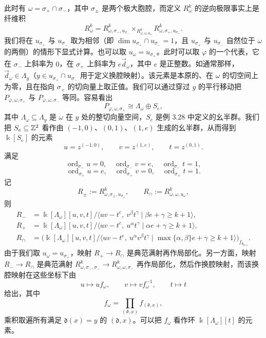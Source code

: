 此时有 $\omega=\sigma_+\cap\sigma_-$，其中 $\sigma_\pm$ 是两个极大胞腔，而定义 $R^k_\omega$ 的逆向极限事实上是纤维积
\[
  R^k_\omega=R^k_{\omega,\sigma_-,u_{\sigma_-}}
  \times_{R^k_{\omega,\omega,u_\omega}}R^k_{\omega,\sigma_+,u_{\sigma_+}}.
\]
我们将在 $u_{\sigma_+}$ 与 $u_{\sigma_-}$ 取为相邻（即 $\dim u_{\sigma_+}\cap u_{\sigma_-}=1$，且 $u_{\sigma_+}$ 与 $u_{\sigma_-}$ 自然位于 $\omega$ 的两侧）的情形下显式计算。也可以取 $u_\omega=u_{\sigma_+}$。此时可以取 $\varphi$ 的一个代表，它在 $\sigma_-$ 上斜率为 $0$，在 $\sigma_+$ 上斜率为 $e\vec d_\omega$，其中 $e$ 是正整数。如通常那样，$\vec d_\omega\in\Lambda_y$（$y\in u_{\sigma_+}\cap u_{\sigma_-}$ 用于定义换腔映射）。该元素是本原的、在 $\omega$ 的切空间上为零，且在指向 $\sigma_+$ 的切向量上取正值。我们可以通过穿过 $y$ 的平行移动把 $P_{\varphi,\omega,\sigma_+}$ 与 $P_{\varphi,\omega,\sigma_-}$ 等同。容易看出
\[
  P_{\varphi,\omega,\sigma_+}\cong\Lambda_\omega\oplus S_e,
\]
其中 $\Lambda_\omega\subseteq\Lambda_y$ 是 $\omega$ 在 $y$ 处的整切向量空间，$S_e$ 是例 3.28 中定义的幺半群。我们把 $S_e\subseteq\mathbb{Z}^2$ 看作由 $(-1,0)$、$(0,1)$、$(1,e)$ 生成的幺半群，从而得到 $\Bbbk[S_e]$ 的元素
\[
  u=z^{(-1,0)},\qquad v=z^{(1,e)},\qquad t=z^{(0,1)}.
\]
满足
\[
  \operatorname{ord}_{\sigma_-}u=0,\quad
  \operatorname{ord}_{\sigma_-}v=e,\quad
  \operatorname{ord}_{\sigma_-}t=1,
\]
\[
  \operatorname{ord}_{\sigma_+}u=e,\quad
  \operatorname{ord}_{\sigma_+}v=0,\quad
  \operatorname{ord}_{\sigma_+}t=1.
\]
记
\[
  R_\pm:=R^k_{\omega,\sigma_\pm,u_{\sigma_\pm}},\qquad
  R_\cap:=R^k_{\omega,\omega,u_\omega},
\]
则
\[
  \begin{aligned}
    R_-&=\Bbbk[\Lambda_\omega][u,v,t]/\langle uv-t^e,\ v^\beta t^\gamma\mid
    \beta e+\gamma\ge k+1\rangle,\\
    R_+&=\Bbbk[\Lambda_\omega][u,v,t]/\langle uv-t^e,\ u^\alpha t^\gamma\mid
    \alpha e+\gamma\ge k+1\rangle,\\
    R_\cap&=\bigl(\Bbbk[\Lambda_\omega][u,v,t]/\langle uv-t^e,\ u^\alpha v^\beta t^\gamma\mid
    \max\{\alpha,\beta\}e+\gamma\ge k+1\rangle\bigr)_{f_{\mathfrak d_{p,\pm}}}.
  \end{aligned}
\]
由于我们取 $u_\omega=u_{\sigma_+}$，映射 $R_+\to R_\cap$ 是典范满射再作局部化。另一方面，映射 $R_-\to R_\cap$ 是典范满射 $R^k_{\omega,\sigma_-,\sigma_-}\to R^k_{\omega,\omega,\sigma_-}$ 再作局部化，然后作换腔映射，而该换腔映射在这些坐标下由
\[
  u\mapsto uf_\omega,\qquad v\mapsto vf_\omega^{-1},\qquad t\mapsto t
\]
给出，其中
\[
  f_\omega=\prod_{(\mathfrak d,x)}f_{(\mathfrak d,x)},
\]
乘积取遍所有满足 $\mathfrak d(x)=y$ 的 $(\mathfrak d,x)$。可以把 $f_\omega$ 看作环 $\Bbbk[\Lambda_\omega][t]$ 的元素。

